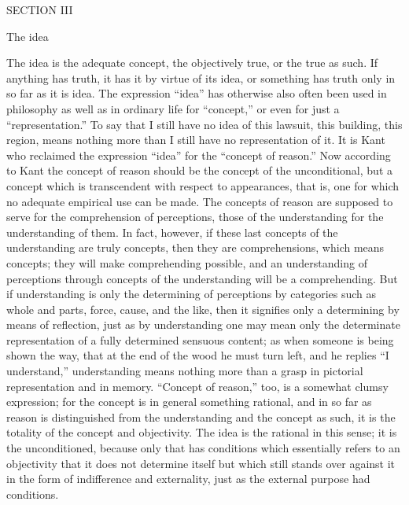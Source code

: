 SECTION III

The idea

The idea is the adequate concept,
the objectively true,
or the true as such.
If anything has truth,
it has it by virtue of its idea,
or something has truth only
in so far as it is idea.
The expression “idea” has otherwise also often been used
in philosophy as well as in ordinary life for “concept,”
or even for just a “representation.”
To say that I still have no idea of
this lawsuit, this building, this region,
means nothing more than I still have no representation of it.
It is Kant who reclaimed the expression “idea”
for the “concept of reason.”
Now according to Kant the concept of reason
should be the concept of the unconditional,
but a concept which is transcendent with respect to appearances,
that is, one for which no adequate empirical use can be made.
The concepts of reason are supposed to serve
for the comprehension of perceptions,
those of the understanding for the understanding of them.
In fact, however, if these last
concepts of the understanding are truly concepts,
then they are comprehensions, which means concepts;
they will make comprehending possible,
and an understanding of perceptions
through concepts of the understanding
will be a comprehending.
But if understanding is only
the determining of perceptions by categories
such as whole and parts, force, cause, and the like,
then it signifies only a determining by means of reflection,
just as by understanding one may mean only the determinate
representation of a fully determined sensuous content;
as when someone is being shown the way,
that at the end of the wood he must turn left,
and he replies “I understand,”
understanding means nothing more than a grasp
in pictorial representation and in memory.
“Concept of reason,” too, is a somewhat clumsy expression;
for the concept is in general something rational,
and in so far as reason is distinguished
from the understanding and the concept as such,
it is the totality of the concept and objectivity.
The idea is the rational in this sense;
it is the unconditioned,
because only that has conditions
which essentially refers to an objectivity
that it does not determine itself
but which still stands over against it
in the form of indifference and externality,
just as the external purpose had conditions.

